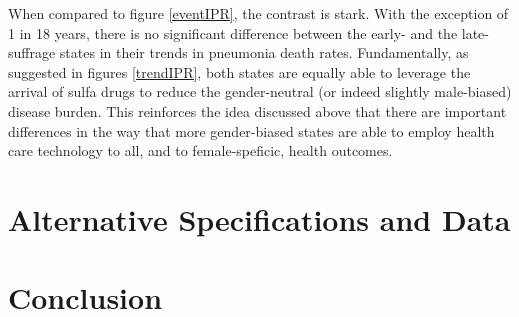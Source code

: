 \documentclass[11pt]{article}
\begin{document}
\begin{spacing}{1.4}
When compared to figure \ref{eventIPR}, the contrast is stark.  With the exception of 1 
in 18 years, there is no significant difference between the early- and the late-suffrage 
states in their trends in pneumonia death rates.  Fundamentally, as suggested in figures 
\ref{trendIPR}, both states are equally able to leverage the arrival of sulfa drugs to 
reduce the gender-neutral (or indeed slightly male-biased) disease burden. This 
reinforces the idea discussed above that there are important differences in the way that 
more gender-biased states are able to employ health care technology to all, and to 
female-speficic, health outcomes.

\section{Alternative Specifications and Data}


\section{Conclusion}



\newpage



\newpage

\end{spacing}
\end{document}
